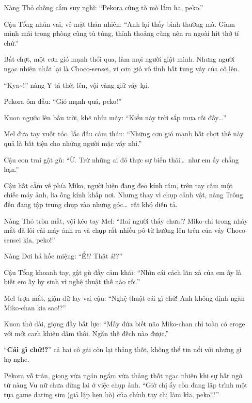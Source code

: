 \documentclass[../main.tex]{subfiles}
\begin{document}
Nàng Thỏ chống cằm suy nghĩ: ``Pekora cũng tò mò lắm ha, peko.''

Cậu Tổng nhún vai, vẻ mặt thản nhiên: ``Anh lại thấy bình thường mà. Giam mình mãi trong phòng cũng tù túng, thỉnh thoảng cũng nên ra ngoài hít thở tí chứ.''

Bất chợt, một cơn gió mạnh thổi qua, làm mọi người giật mình. Nhưng người ngạc nhiên nhất lại là Choco-sensei, vì cơn gió vô tình hất tung váy của cô lên.

``Kya\~{}!'' nàng Y tá thét lên, vội vàng giữ váy lại.

Pekora ôm đầu: ``Gió mạnh quá, peko!''

Kuon ngước lên bầu trời, khẽ nhíu mày: ``Kiểu này trời sắp mưa rồi đấy\dots''

Mel đưa tay vuốt tóc, lắc đầu cảm thán: ``Những cơn gió mạnh bất chợt thế này quả là bất tiện cho những người mặc váy nhỉ.''

Cậu con trai gật gù: ``Ừ. Trừ những ai đó thực sự biến thái\dots\ như em ấy chẳng hạn.''

Cậu hất cằm về phía Miko, người hiện đang đeo kính râm, trên tay cầm một chiếc máy ảnh, lia ống kính khắp nơi. Nhưng thay vì chụp cảnh vật, nàng Trông đền đang tập trung chụp vào những góc\dots\ rất khó diễn tả.


Nàng Thỏ tròn mắt, vội kéo tay Mel: ``Hai người thấy chưa!? Miko-chi trong nháy mắt đã lôi cái máy ảnh ra và chụp rất nhiều pô từ hướng lên trên của váy Choco-sensei kìa, peko!''

Nàng Dơi há hốc miệng: ``Ể!? Thật á!?''

Cậu Tổng khoanh tay, gật gù đầy cảm khái: ``Nhìn cái cách lăn xả của em ấy là biết em ấy hy sinh vì nghệ thuật thế nào rồi.''

Mel trợn mắt, giận dữ lay vai cậu: ``Nghệ thuật cái gì chứ! Anh không định ngăn Miko-chan kia sao!?''

Kuon thở dài, giọng đầy bất lực: ``Mấy đứa biết não Miko-chan chỉ toàn có eroge với mới carh khiêu dâm thôi. Ngăn thế đếch nào được.''

``\textbf{Cái gì chứ!?}'' cả hai cô gái còn lại thảng thốt, không thể tin nổi với những gì họ nghe.

Pekora vỗ trán, giọng vừa ngán ngẩm vừa thảng thốt ngạc nhiên khi sự bất ngờ từ nàng Vu nữ chưa dừng lại ở việc chụp ảnh. ``Giờ chị ấy còn đang lập trình một tựa game dating sim (giả lập hẹn hò) của chính tay chị làm kìa, peko!!!''
\end{document}
